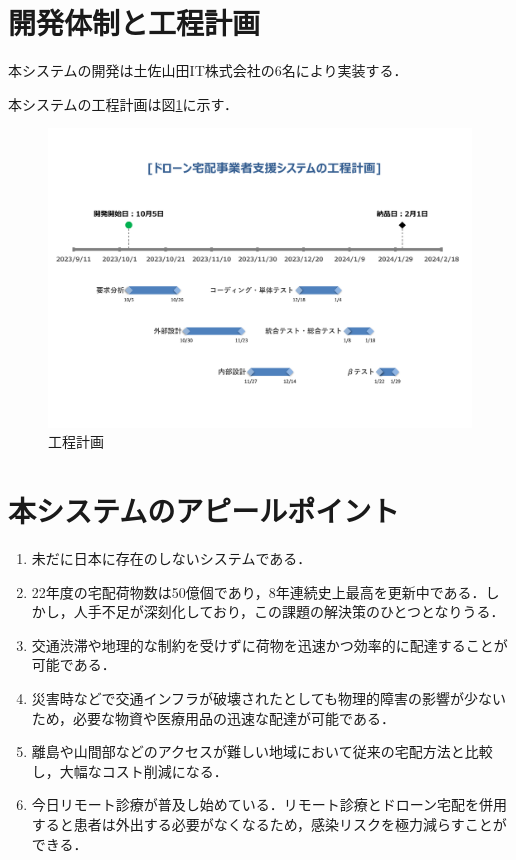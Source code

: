 \documentclass[a4paper, titlepage]{jsarticle}
\begin{document}
\section{開発体制と工程計画}
本システムの開発は土佐山田IT株式会社の6名により実装する．

本システムの工程計画は図\ref{schedule}に示す．
\begin{figure}[htbp]
  \label{schedule}
  \centering
  \includegraphics[width=15cm]{schedule.pdf}
  \caption{工程計画}
\end{figure}

\section{本システムのアピールポイント}
\begin{enumerate}
\item 未だに日本に存在のしないシステムである．
\item 22年度の宅配荷物数は50億個であり，8年連続史上最高を更新中である．しかし，人手不足が深刻化しており，この課題の解決策のひとつとなりうる．
\item 交通渋滞や地理的な制約を受けずに荷物を迅速かつ効率的に配達することが可能である．
\item 災害時などで交通インフラが破壊されたとしても物理的障害の影響が少ないため，必要な物資や医療用品の迅速な配達が可能である．
\item 離島や山間部などのアクセスが難しい地域において従来の宅配方法と比較し，大幅なコスト削減になる．
\item 今日リモート診療が普及し始めている．リモート診療とドローン宅配を併用すると患者は外出する必要がなくなるため，感染リスクを極力減らすことができる．
\end{enumerate}
\end{document}

